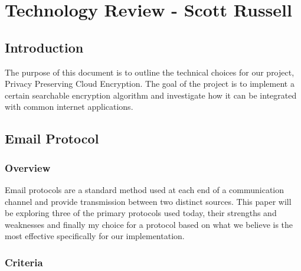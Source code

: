 
\chapter{Technology Review - Scott Russell}

\section{ Introduction }

The purpose of this document is to outline the technical choices for our project, Privacy Preserving Cloud Encryption. The goal of the project is to implement a certain searchable encryption algorithm and investigate how it can be integrated with common internet applications.


\section{ Email Protocol }

\subsection{ Overview }

Email protocols are a standard method used at each end of a communication channel and provide transmission between two distinct sources. This paper will be exploring three of the primary protocols used today, their strengths and weaknesses and finally my choice for a protocol based on what we believe is the most effective specifically for our implementation.
\subsection{ Criteria }

